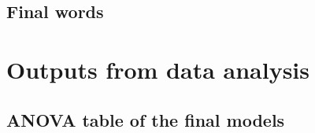 \documentclass{aucklandthesis}
\begin{document}
\hypertarget{final-words}{%
\section{Final words}\label{final-words}}

\appendix

\hypertarget{ch:model-output}{%
\chapter{Outputs from data analysis}\label{ch:model-output}}

\hypertarget{anova-table-of-the-final-models}{%
\section{ANOVA table of the final models}\label{anova-table-of-the-final-models}}
\end{document}
